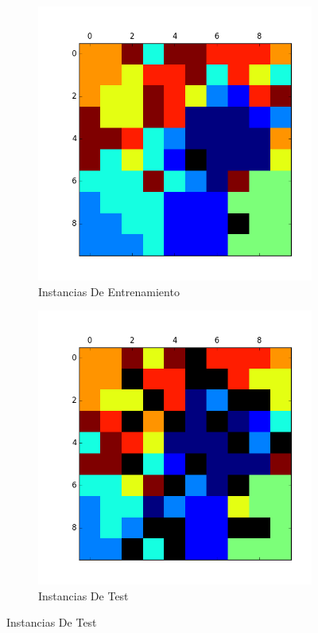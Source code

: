 \begin{figure}[h!]
\centering
\begin{subfigure}{.5\textwidth}
  \centering
  \includegraphics[width=.9\linewidth]{testeo_test_kohen2/entrenamiento.png}
  \caption{Instancias De Entrenamiento}
  \label{fig:sub1}
\end{subfigure}%
\begin{subfigure}{.5\textwidth}
  \centering
  \includegraphics[width=.9\linewidth]{testeo_test_kohen2/test.png}
  \caption{Instancias De Test}
  \label{fig:sub2}
\end{subfigure}
  \caption{Instancias De Test}
\label{fig:test}
\end{figure}

